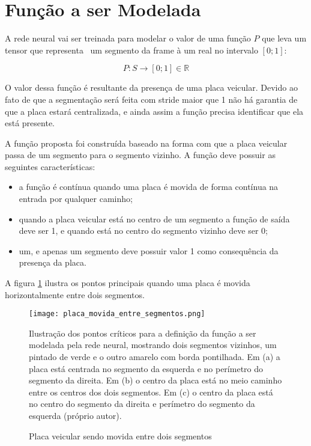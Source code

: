 \section{Função a ser Modelada} \label{ses:funcao_a_modelar}

A rede neural vai ser treinada para modelar o valor de uma função $P$ que
leva um tensor que representa  um segmento da frame à um real no intervalo
$[0;1]$:

\begin{equation}
	P:S \to [0;1] \in \mathbb{R} 
\end{equation}

O valor dessa função é resultante da presença de uma placa veicular. Devido ao
fato de que a segmentação será feita com stride maior que 1 não há garantia de
que a placa estará centralizada, e ainda assim a função precisa identificar que
ela está presente.

A função proposta foi construída baseado na forma com que a placa veicular
passa de um segmento para o segmento vizinho. A função deve possuir as
seguintes características:

\begin{itemize}
\item a função é contínua quando uma placa é movida de forma contínua na
	entrada por qualquer caminho;
\item quando a placa veicular está no centro de um segmento a função de
	saída deve ser 1, e quando está no centro do segmento vizinho deve ser 0;
\item um, e apenas um segmento deve possuir valor 1 como consequência da
	presença da placa.
\end{itemize}

A figura \ref{fig:placa_movida_entre_segmentos} ilustra os pontos principais
quando uma placa é movida horizontalmente entre dois segmentos.

\begin{figure}[!htb]
	\centering
	\texttt{[image: placa\_movida\_entre\_segmentos.png]}
	\caption{Placa veicular sendo movida entre dois segmentos}
	\label{fig:placa_movida_entre_segmentos}
	Ilustração dos pontos críticos para a definição da função a ser modelada
	pela rede neural, mostrando dois segmentos vizinhos, um pintado de verde e
	o outro amarelo com borda pontilhada. Em (a) a placa está centrada no
	segmento da esquerda e no perímetro do segmento da direita.
	Em (b) o centro da placa está no meio caminho entre os centros dos dois
	segmentos. Em (c) o centro da placa está no centro do segmento da direita e
	perímetro do segmento da esquerda (próprio autor).
\end{figure}

